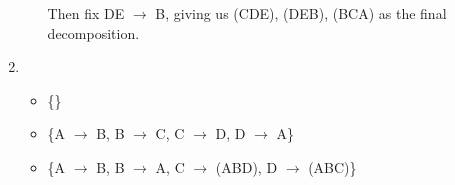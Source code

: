 \documentclass[10pt]{article}
\begin{document}
\begin{enumerate}[label=\textbf{\arabic*.}, listparindent=0.0em, itemsep=1em]
\begin{itemize}
                  Then fix DE $\to$ B, giving us (CDE), (DEB), (BCA) as the final decomposition.
        \end{itemize}
    \item 
        \begin{itemize}
            \item \{\}
            \item \{A $\to$ B, B $\to$ C, C $\to$ D, D $\to$ A\}
            \item \{A $\to$ B, B $\to$ A, C $\to$ (ABD), D $\to$ (ABC)\} 
        \end{itemize}
        
\end{enumerate}
\end{document}
